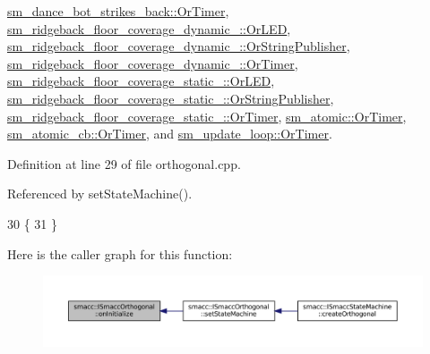 \hyperlink{classsm__dance__bot__strikes__back_1_1OrTimer_a89c7a3040c7d44d877d8b85b89883cb1}{sm\+\_\+dance\+\_\+bot\+\_\+strikes\+\_\+back\+::\+Or\+Timer}, \hyperlink{classsm__ridgeback__floor__coverage__dynamic__1_1_1OrLED_a4782b11d815df2f21e3e04213d03975a}{sm\+\_\+ridgeback\+\_\+floor\+\_\+coverage\+\_\+dynamic\+\_\+::\+Or\+L\+ED}, \hyperlink{classsm__ridgeback__floor__coverage__dynamic__1_1_1OrStringPublisher_ab9147f2ca673acef0f48df517bf8be39}{sm\+\_\+ridgeback\+\_\+floor\+\_\+coverage\+\_\+dynamic\+\_\+::\+Or\+String\+Publisher}, \hyperlink{classsm__ridgeback__floor__coverage__dynamic__1_1_1OrTimer_aad2bbd43de3231354372066394231e21}{sm\+\_\+ridgeback\+\_\+floor\+\_\+coverage\+\_\+dynamic\+\_\+::\+Or\+Timer}, \hyperlink{classsm__ridgeback__floor__coverage__static__1_1_1OrLED_af9bd0d065de558ff0b33adec30523e06}{sm\+\_\+ridgeback\+\_\+floor\+\_\+coverage\+\_\+static\+\_\+::\+Or\+L\+ED}, \hyperlink{classsm__ridgeback__floor__coverage__static__1_1_1OrStringPublisher_acf3ba60692bf9626ea438efde03c266d}{sm\+\_\+ridgeback\+\_\+floor\+\_\+coverage\+\_\+static\+\_\+::\+Or\+String\+Publisher}, \hyperlink{classsm__ridgeback__floor__coverage__static__1_1_1OrTimer_ab7e12a43aebecc3e6981b33552703dd1}{sm\+\_\+ridgeback\+\_\+floor\+\_\+coverage\+\_\+static\+\_\+::\+Or\+Timer}, \hyperlink{classsm__atomic_1_1OrTimer_a509b0d9ce7c6ed9e0c291decaf6dd280}{sm\+\_\+atomic\+::\+Or\+Timer}, \hyperlink{classsm__atomic__cb_1_1OrTimer_a0d010997d6304786b2b91ae3f32fa978}{sm\+\_\+atomic\+\_\+cb\+::\+Or\+Timer}, and \hyperlink{classsm__update__loop_1_1OrTimer_af2b4637bc236bcaada12b703c5f0a110}{sm\+\_\+update\+\_\+loop\+::\+Or\+Timer}.



Definition at line 29 of file orthogonal.\+cpp.



Referenced by set\+State\+Machine().


\begin{DoxyCode}
30   \{
31   \}
\end{DoxyCode}
Here is the caller graph for this function\+:
\nopagebreak
\begin{figure}[H]
\begin{center}
\leavevmode
\includegraphics[width=350pt]{classsmacc_1_1ISmaccOrthogonal_a6bb31c620cb64dd7b8417f8705c79c7a_icgraph}
\end{center}
\end{figure}
\mbox{\label{classsmacc_1_1ISmaccOrthogonal_a602e16b09f8a1b3de889f2f3d90a3211}} 
